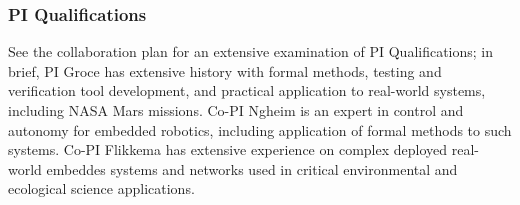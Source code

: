 \subsubsection{PI Qualifications}

See the collaboration plan for an extensive examination of PI Qualifications; in brief, PI Groce has extensive history with formal methods, testing and verification tool development, and practical application to real-world systems, including NASA Mars missions.  Co-PI Ngheim is an expert in control and autonomy for embedded robotics, including application of formal methods to such systems.  Co-PI Flikkema has extensive experience on complex deployed real-world embeddes systems and networks used in critical environmental and ecological science applications.

